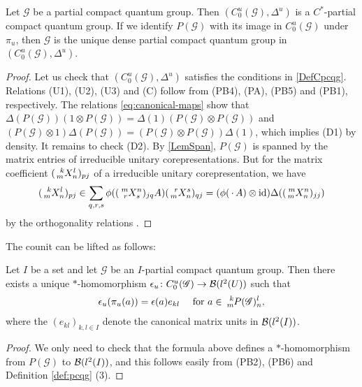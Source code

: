 \begin{Prop}\label{prop:universal-cpcqg}
  Let $\mathscr{G}$ be a partial compact quantum group. Then $(C^{u}_{0}(\mathscr{G}),\Delta^{u})$  is a $C^{*}$-partial compact quantum group. If we identify $P(\mathscr{G})$ with its image in $C^{u}_{0}(\mathscr{G})$ under $\pi_{u}$, then $\mathscr{G}$ is the unique dense partial compact quantum group in $(C^{u}_{0}(\mathscr{G}),\Delta^{u})$.
\end{Prop}
\begin{proof}
Let us check that $(C^{u}_{0}(\mathscr{G}),\Delta^{u})$ satisfies the conditions in \ref{DefCpcqg}.  Relations (U1), (U2), (U3) and (C) follow from (PB4), (PA), (PB5) and (PB1), respectively. The relations \eqref{eq:canonical-maps} show that
$\Delta(P(\mathscr{G}))(1\otimes P(\mathscr{G})) = \Delta(1)(P(\mathscr{G}) \otimes P(\mathscr{G}))$ and
$(P(\mathscr{G}) \otimes 1)\Delta(P(\mathscr{G})) = (P(\mathscr{G}) \otimes P(\mathscr{G}))\Delta(1)$, which implies (D1) by density. It remains to check (D2). By \ref{LemSpan}, $P(\mathscr{G})$ is spanned by the matrix entries of irreducible unitary corepresentations. But for the matrix coefficient $(\Gr{X}{k}{l}{m}{n})_{pj}$ of  a irreducible unitary corepresentation, we have \[ (\Gr{X}{k}{l}{m}{n})_{pj} \in \sum_{q,r,s} \phi((\Gr{X}{m}{n}{r}{s})_{jq}A) (\Gr{X}{r}{s}{m}{n})_{qj} =(\phi(\,\cdot\, A)\otimes \id)\Delta((\Gr{X}{m}{n}{m}{n})_{jj})\] by the orthogonality relations \cite[Corollary 2.22]{DCT1}. 
\end{proof}
The counit can be lifted as follows:
\begin{Prop}
  Let $I$ be a set and let $\mathscr{G}$ be an $I$-partial compact quantum group. Then there exists a unique $*$-homomorphism $\epsilon_{u} \colon C^{u}_{0}(\mathscr{G}) \to {\cal B}(l^{2}(U))$ such that 
  \begin{align*}
    \epsilon_{u}(\pi_{u}(a)) = \epsilon(a) e_{kl} \quad \text{ for } a \in \Gr{P(\mathscr{G})}{k}{l}{m}{n},
  \end{align*}
   where the $(e_{kl})_{k,l\in I}$ denote the canonical matrix units in ${\cal B}(l^{2}(I))$.
\end{Prop}
\begin{proof}
  We only need to check that the formula above defines a  $*$-homomorphism from $P(\mathscr{G})$ to ${\cal B}(l^{2}(I))$,   and this follows easily from (PB2), (PB6) and Definition \ref{def:pcqg} (3).
\end{proof}
